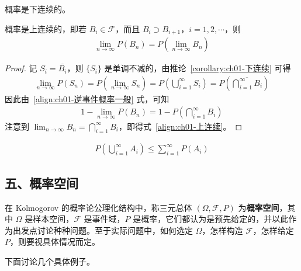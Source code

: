 \documentclass[../../main.tex]{subfiles}
\begin{document}
\begin{corollary}\label{corollary:ch01-下连续}
概率是下连续的。
\end{corollary}

\begin{corollary}[上连续]\label{corollary:ch01-上连续}
概率是上连续的，即若 $B_i\in\mathscr{F}$，而且 $B_i\supset B_{i+1}$，$i=1,2,\cdots$，则
\begin{align}
\lim_{n\to\infty}P(B_n)=P\left(\lim_{n\to\infty}B_n\right)\label{align:ch01-上连续}
\end{align}
\end{corollary}

\begin{proof}
记 $S_i=\overline{B_i}$，则 $\{S_i\}$ 是单调不减的，由推论~\ref{corollary:ch01-下连续} 可得
\begin{align*}
\lim_{n\to\infty}P(S_n)=P\left(\lim_{n\to\infty}S_n\right)=P\left(\bigcup_{i=1}^{\infty}S_i\right)=P\left(\overline{\bigcap_{i=1}^{\infty}B_i}\right)
\end{align*}
因此由~\eqref{align:ch01-逆事件概率一般} 式，可知
\begin{align*}
1-\lim_{n\to\infty}P(B_n)=1-P\left(\bigcap_{i=1}^{\infty}B_i\right)
\end{align*}
注意到 $\lim_{n\to\infty}B_n=\bigcap_{i=1}^{\infty}B_i$，即得式~\eqref{align:ch01-上连续}。
\end{proof}

\begin{corollary}\label{corollary:ch01-次可加}
\begin{align*}
P\left(\bigcup_{i=1}^{\infty}A_i\right)\leqslant\sum_{i=1}^{\infty}P(A_i)
\end{align*}
\end{corollary}

\subsection*{五、概率空间}

在 Kolmogorov 的概率论公理化结构中，称三元总体 $(\Omega,\mathscr{F},P)$ 为\textbf{概率空间}，其中 $\Omega$ 是样本空间，$\mathscr{F}$ 是事件域，$P$ 是概率，它们都认为是预先给定的，并以此作为出发点讨论种种问题。至于实际问题中，如何选定 $\Omega$，怎样构造 $\mathscr{F}$，怎样给定 $P$，则要视具体情况而定。

下面讨论几个具体例子。
\end{document}
